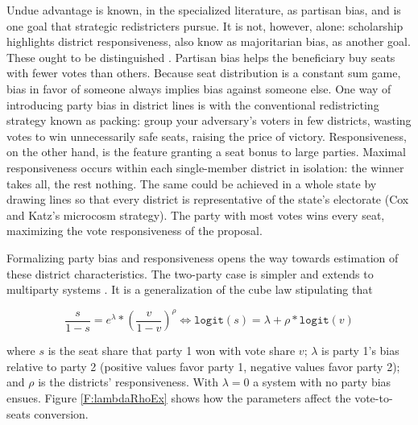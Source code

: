 \documentclass[letter,12pt]{article}
\begin{document}
Undue advantage is known, in the specialized literature, as partisan bias, and is one goal that strategic redistricters pursue. It is not, however, alone: scholarship highlights district responsiveness, also know as majoritarian bias, as another goal. These ought to be distinguished \citep[this paragraph draws heavily on][, ch.\ 3]{cox.katz.2002}. Partisan bias helps the beneficiary buy seats with fewer votes than others. Because seat distribution is a constant sum game, bias in favor of someone always implies bias against someone else. One way of introducing party bias in district lines is with the conventional redistricting strategy known as packing: group your adversary's voters in few districts, wasting votes to win unnecessarily safe seats, raising the price of victory. Responsiveness, on the other hand, is the feature granting a seat bonus to large parties. Maximal responsiveness occurs within each single-member district in isolation: the winner takes all, the rest nothing. The same could be achieved in a whole state by drawing lines so that every district is representative of the state's electorate (Cox and Katz's microcosm strategy). The party with most votes wins every seat, maximizing the vote responsiveness of the proposal. 

Formalizing party bias and responsiveness opens the way towards estimation of these district characteristics. The two-party case is simpler and extends to multiparty systems \citep{taagepera.CubeLaw.1973,tufte1973seatsVotes,king.browning1987biasRespUS}. It is a generalization of the cube law stipulating that 

\begin{equation}
 \frac{s}{1-s} = e^\lambda *  \left(\frac{v}{1-v}\right)^\rho \iff
 \texttt{logit}(s) = \lambda + \rho *  \texttt{logit}(v)
\end{equation}\label{E:cubeLaw}

\noindent where $s$ is the seat share that party 1 won with vote share $v$; $\lambda$ is party 1's bias relative to party 2 (positive values favor party 1, negative values favor party 2); and $\rho$ is the districts' responsiveness. With $\lambda=0$ a system with no party bias ensues. Figure \ref{F:lambdaRhoEx} shows how the parameters affect the vote-to-seats conversion. 

\end{document}
